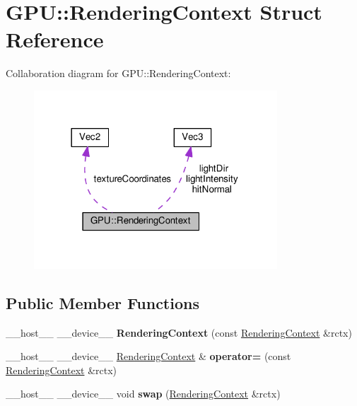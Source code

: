 \hypertarget{struct_g_p_u_1_1_rendering_context}{}\section{G\+PU\+:\+:Rendering\+Context Struct Reference}
\label{struct_g_p_u_1_1_rendering_context}


Collaboration diagram for G\+PU\+:\+:Rendering\+Context\+:
\nopagebreak
\begin{figure}[H]
\begin{center}
\leavevmode
\includegraphics[width=258pt]{struct_g_p_u_1_1_rendering_context__coll__graph}
\end{center}
\end{figure}
\subsection*{Public Member Functions}
\begin{DoxyCompactItemize}
\item 
\+\_\+\+\_\+host\+\_\+\+\_\+ \+\_\+\+\_\+device\+\_\+\+\_\+ {\bfseries Rendering\+Context} (const \hyperlink{struct_g_p_u_1_1_rendering_context}{Rendering\+Context} \&rctx)\hypertarget{struct_g_p_u_1_1_rendering_context_afe4884d3990468289b68d97f3374de53}{}\label{struct_g_p_u_1_1_rendering_context_afe4884d3990468289b68d97f3374de53}

\item 
\+\_\+\+\_\+host\+\_\+\+\_\+ \+\_\+\+\_\+device\+\_\+\+\_\+ \hyperlink{struct_g_p_u_1_1_rendering_context}{Rendering\+Context} \& {\bfseries operator=} (const \hyperlink{struct_g_p_u_1_1_rendering_context}{Rendering\+Context} \&rctx)\hypertarget{struct_g_p_u_1_1_rendering_context_a9e187b5378b9ef7f95870a16be6c42d5}{}\label{struct_g_p_u_1_1_rendering_context_a9e187b5378b9ef7f95870a16be6c42d5}

\item 
\+\_\+\+\_\+host\+\_\+\+\_\+ \+\_\+\+\_\+device\+\_\+\+\_\+ void {\bfseries swap} (\hyperlink{struct_g_p_u_1_1_rendering_context}{Rendering\+Context} \&rctx)\hypertarget{struct_g_p_u_1_1_rendering_context_a03ef8006865af61b7010de8f4a76a3a3}{}\label{struct_g_p_u_1_1_rendering_context_a03ef8006865af61b7010de8f4a76a3a3}

\end{DoxyCompactItemize}
